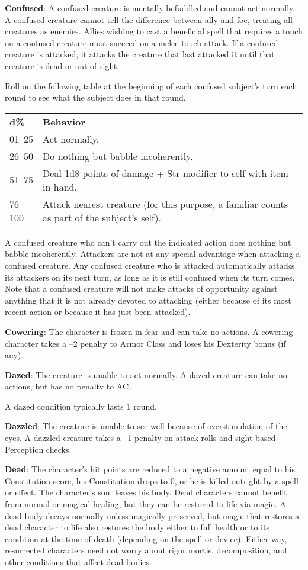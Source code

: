 \textbf{Confused}: A confused creature is mentally befuddled and cannot act normally. A confused creature cannot tell the difference between ally and foe, treating all creatures as enemies. Allies wishing to cast a beneficial spell that requires a touch on a confused creature must succeed on a melee touch attack. If a confused creature is attacked, it attacks the creature that last attacked it until that creature is dead or out of sight.
				
Roll on the following table at the beginning of each confused subject's turn each round to see what the subject does in that round. 


\begin{tabularx}{\linewidth}{lX}
\textbf{d\%} & \textbf{Behavior} \\
01--25 & Act normally.\\
26--50 & Do nothing but babble incoherently.\\
51--75 & Deal 1d8 points of damage + Str modifier to self with item in hand.\\
76--100 & Attack nearest creature (for this purpose, a familiar counts as part of the subject's self).\\
\end{tabularx}

A confused creature who can't carry out the indicated action does nothing but babble incoherently. Attackers are not at any special advantage when attacking a confused creature. Any confused creature who is attacked automatically attacks its attackers on its next turn, as long as it is still confused when its turn comes. Note that a confused creature will not make attacks of opportunity against anything that it is not already devoted to attacking (either because of its most recent action or because it has just been attacked).
				
\textbf{Cowering}: The character is frozen in fear and can take no actions. A cowering character takes a --2 penalty to Armor Class and loses his Dexterity bonus (if any).
				
\textbf{Dazed}: The creature is unable to act normally. A dazed creature can take no actions, but has no penalty to AC.
				
A dazed condition typically lasts 1 round.
				
\textbf{Dazzled}: The creature is unable to see well because of overstimulation of the eyes. A dazzled creature takes a --1 penalty on attack rolls and sight-based Perception checks.
				
\textbf{Dead}: The character's hit points are reduced to a negative amount equal to his Constitution score, his Constitution drops to 0, or he is killed outright by a spell or effect. The character's soul leaves his body. Dead characters cannot benefit from normal or magical healing, but they can be restored to life via magic. A dead body decays normally unless magically preserved, but magic that restores a dead character to life also restores the body either to full health or to its condition at the time of death (depending on the spell or device). Either way, resurrected characters need not worry about rigor mortis, decomposition, and other conditions that affect dead bodies.
				
